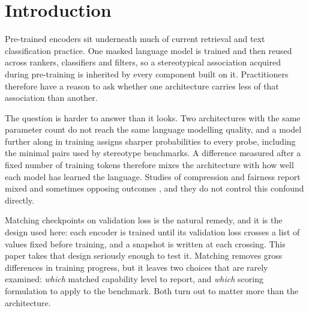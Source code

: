 \documentclass[sigconf,natbib=true,anonymous=true]{acmart}
\begin{document}


\maketitle

\section{Introduction}

Pre-trained encoders sit underneath much of current retrieval and text
classification practice. One masked language model is trained and then reused
across rankers, classifiers and filters, so a stereotypical association acquired
during pre-training is inherited by every component built on it. Practitioners
therefore have a reason to ask whether one architecture carries less of that
association than another.

The question is harder to answer than it looks. Two architectures with the same
parameter count do not reach the same language modelling quality, and a model
further along in training assigns sharper probabilities to every probe, including
the minimal pairs used by stereotype benchmarks. A difference measured after a
fixed number of training tokens therefore mixes the architecture with how well
each model has learned the language. Studies of compression and fairness report
mixed and sometimes opposing outcomes
\citep{hooker2020characterising,xu2022compression,ramesh2023comparative}, and
they do not control this confound directly.

Matching checkpoints on validation loss is the natural remedy, and it is the
design used here: each encoder is trained until its validation loss crosses a
list of values fixed before training, and a snapshot is written at each crossing.
This paper takes that design seriously enough to test it. Matching removes gross
differences in training progress, but it leaves two choices that are rarely
examined: \emph{which} matched capability level to report, and \emph{which}
scoring formulation to apply to the benchmark. Both turn out to matter more than
the architecture.
\end{document}
